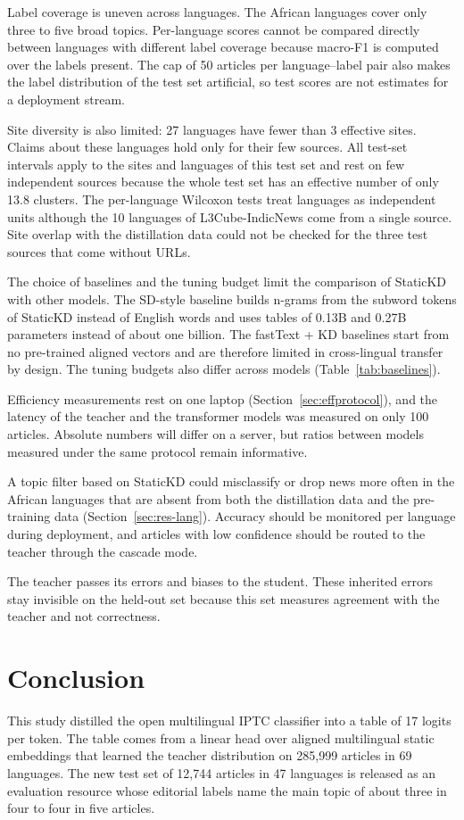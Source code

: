 \documentclass{ieeeaccess}
\begin{document}
Label coverage is uneven across languages. The African languages cover only three to five broad topics. Per-language scores cannot be compared directly between languages with different label coverage because macro-F1 is computed over the labels present. The cap of 50 articles per language--label pair also makes the label distribution of the test set artificial, so test scores are not estimates for a deployment stream.

Site diversity is also limited: 27 languages have fewer than 3 effective sites. Claims about these languages hold only for their few sources. All test-set intervals apply to the sites and languages of this test set and rest on few independent sources because the whole test set has an effective number of only 13.8 clusters. The per-language Wilcoxon tests treat languages as independent units although the 10 languages of L3Cube-IndicNews come from a single source. Site overlap with the distillation data could not be checked for the three test sources that come without URLs.

The choice of baselines and the tuning budget limit the comparison of StaticKD with other models. The SD-style baseline builds n-grams from the subword tokens of StaticKD instead of English words and uses tables of 0.13B and 0.27B parameters instead of about one billion. The fastText + KD baselines start from no pre-trained aligned vectors and are therefore limited in cross-lingual transfer by design. The tuning budgets also differ across models (Table~\ref{tab:baselines}).

Efficiency measurements rest on one laptop (Section~\ref{sec:effprotocol}), and the latency of the teacher and the transformer models was measured on only 100 articles. Absolute numbers will differ on a server, but ratios between models measured under the same protocol remain informative.

A topic filter based on StaticKD could misclassify or drop news more often in the African languages that are absent from both the distillation data and the pre-training data (Section~\ref{sec:res-lang}). Accuracy should be monitored per language during deployment, and articles with low confidence should be routed to the teacher through the cascade mode.

The teacher passes its errors and biases to the student. These inherited errors stay invisible on the held-out set because this set measures agreement with the teacher and not correctness.

\section{Conclusion}
\label{sec:conclusion}
This study distilled the open multilingual IPTC classifier into a table of 17 logits per token. The table comes from a linear head over aligned multilingual static embeddings that learned the teacher distribution on 285,999 articles in 69 languages. The new test set of 12,744 articles in 47 languages is released as an evaluation resource whose editorial labels name the main topic of about three in four to four in five articles.
\end{document}
